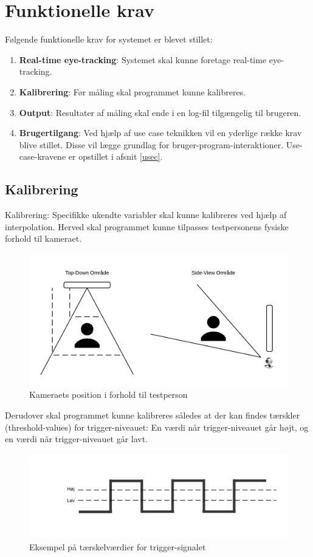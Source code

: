\documentclass[kravspec.tex]{subfiles}
\begin{document}
\section{Funktionelle krav}
Følgende funktionelle krav for systemet er blevet stillet: \\
\begin{enumerate}
	\item 
	\textbf{Real-time eye-tracking}: Systemet skal kunne foretage real-time eye-tracking.
	\item 
	\textbf{Kalibrering}: Før måling skal programmet kunne kalibreres.
	\item
	\textbf{Output}: Resultater af måling skal ende i en log-fil tilgængelig til brugeren.
	\item
	\textbf{Brugertilgang}: Ved hjælp af use case teknikken vil en yderlige række krav blive stillet. Disse vil lægge grundlag for bruger-program-interaktioner. Use-case-kravene er opstillet i afsnit \ref{usec}.  
\end{enumerate}

\subsection{Kalibrering}
Kalibrering: Specifikke ukendte variabler skal kunne kalibreres ved hjælp af interpolation. Herved skal programmet kunne tilpasses testpersonens fysiske forhold til kameraet. 
\begin{figure}[h]
\centering
\includegraphics[width=0.7\linewidth]{../Kamera-testperson}
\caption{Kameraets position i forhold til testperson}
\label{fig:Camposition}
\end{figure}


Derudover skal programmet kunne kalibreres således at der kan findes tærskler (threshold-values) for trigger-niveauet: En værdi når trigger-niveauet går højt, og en værdi når trigger-niveauet går lavt.

\begin{figure}[H]
\centering
\includegraphics[width=0.7\linewidth]{../Trigger-threshold}
\caption{Eksempel på tærskelværdier for trigger-signalet}
\label{fig:Trigger-threshold}
\end{figure}
\end{document}
